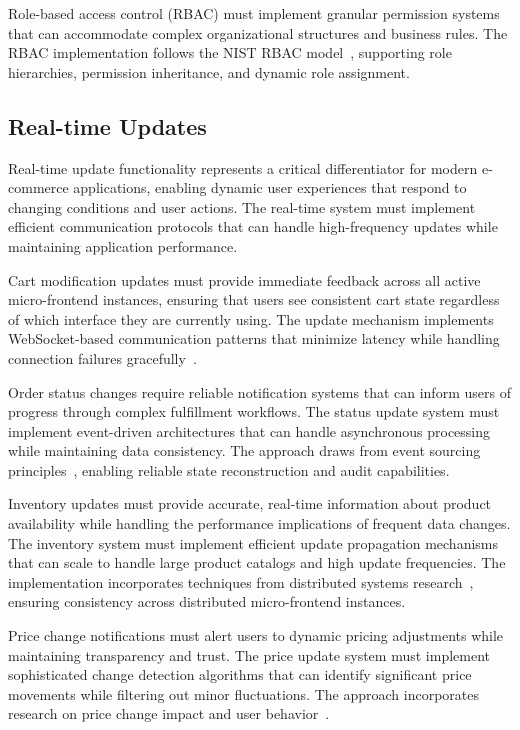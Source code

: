 \documentclass[12pt,a4paper]{report}
\begin{document}
Role-based access control (RBAC) must implement granular permission systems that can accommodate complex organizational structures and business rules. The RBAC implementation follows the NIST RBAC model~\cite{ferraiolo2003rbac}, supporting role hierarchies, permission inheritance, and dynamic role assignment.

\subsection{Real-time Updates}

Real-time update functionality represents a critical differentiator for modern e-commerce applications, enabling dynamic user experiences that respond to changing conditions and user actions. The real-time system must implement efficient communication protocols that can handle high-frequency updates while maintaining application performance.

Cart modification updates must provide immediate feedback across all active micro-frontend instances, ensuring that users see consistent cart state regardless of which interface they are currently using. The update mechanism implements WebSocket-based communication patterns that minimize latency while handling connection failures gracefully~\cite{fette2011websocket}.

Order status changes require reliable notification systems that can inform users of progress through complex fulfillment workflows. The status update system must implement event-driven architectures that can handle asynchronous processing while maintaining data consistency. The approach draws from event sourcing principles~\cite{fowler2005event}, enabling reliable state reconstruction and audit capabilities.

Inventory updates must provide accurate, real-time information about product availability while handling the performance implications of frequent data changes. The inventory system must implement efficient update propagation mechanisms that can scale to handle large product catalogs and high update frequencies. The implementation incorporates techniques from distributed systems research~\cite{lamport1978time}, ensuring consistency across distributed micro-frontend instances.

Price change notifications must alert users to dynamic pricing adjustments while maintaining transparency and trust. The price update system must implement sophisticated change detection algorithms that can identify significant price movements while filtering out minor fluctuations. The approach incorporates research on price change impact and user behavior~\cite{greenleaf1995impact}.
\end{document}
